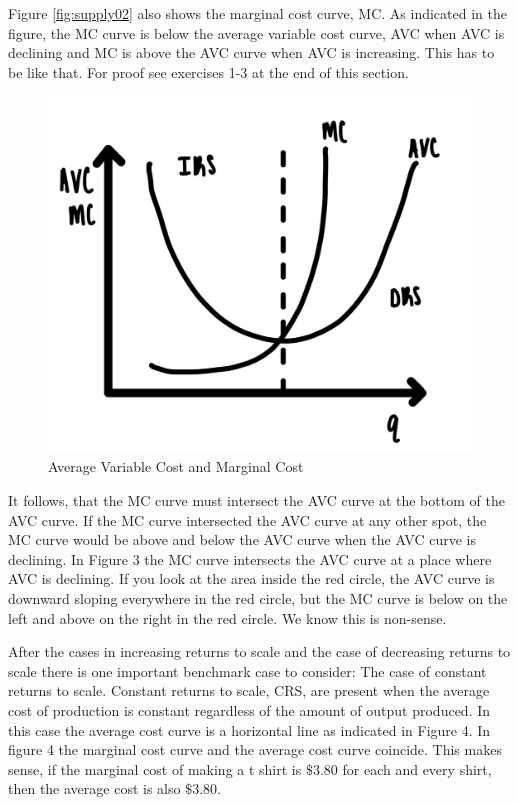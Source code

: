 \documentclass[
]{book}
\begin{document}
Figure \ref{fig:supply02} also shows the marginal cost curve, MC. As indicated in the figure, the MC curve is below the average variable cost curve, AVC when AVC is declining and MC is above the AVC curve when AVC is increasing. This has to be like that. For proof see exercises 1-3 at the end of this section.

\begin{figure}

{\centering \includegraphics[width=0.75\linewidth]{img/supply/fig3} 

}

\caption{Average Variable Cost and Marginal Cost}\label{fig:supply03}
\end{figure}

It follows, that the MC curve must intersect the AVC curve at the bottom of the AVC curve. If the MC curve intersected the AVC curve at any other spot, the MC curve would be above and below the AVC curve when the AVC curve is declining. In Figure 3 the MC curve intersects the AVC curve at a place where AVC is declining. If you look at the area inside the red circle, the AVC curve is downward sloping everywhere in the red circle, but the MC curve is below on the left and above on the right in the red circle. We know this is non-sense.

After the cases in increasing returns to scale and the case of decreasing returns to scale there is one important benchmark case to consider: The case of constant returns to scale.
Constant returns to scale, CRS, are present when the average cost of production is constant regardless of the amount of output produced. In this case the average cost curve is a horizontal line as indicated in Figure 4. In figure 4 the marginal cost curve and the average cost curve coincide. This makes sense, if the marginal cost of making a t shirt is \(\$3.80\) for each and every shirt, then the average cost is also \(\$3.80\).
\end{document}

